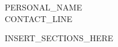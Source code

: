 \documentclass[letterpaper,11pt]{article}
\begin{document}
\begin{center}
  {\LARGE\scshape {{PERSONAL_NAME}}}\\[4pt]
  {\small {{CONTACT_LINE}}}
\end{center}
\vspace{4pt}

{{INSERT_SECTIONS_HERE}}
\end{document}
